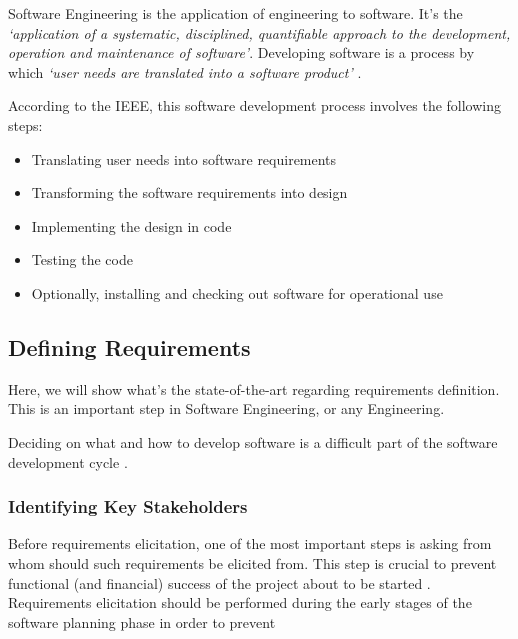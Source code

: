 Software Engineering is the application of engineering to software. It's the \textit{`application of a systematic, disciplined, quantifiable approach to the development, operation and maintenance of software'}. Developing software is a process by which \textit{`user needs are translated into a software product'} \parencite{8016712}.

According to the IEEE, this software development process involves the following steps:

\begin{itemize}

    \item Translating user needs into software requirements
    \item Transforming the software requirements into design
    \item Implementing the design in code
    \item Testing the code
    \item Optionally, installing and checking out software for operational use   
\end{itemize}






\subsection{Defining Requirements}\label{state-of-the-art:ss:defining-requirements}

Here, we will show what's the state-of-the-art regarding requirements definition. This is an important step in Software Engineering, or any Engineering.

Deciding on what and how to develop software is a difficult part of the software development cycle \parencite{pacheco_garcía_reyes_2018}.

\subsubsection{Identifying Key Stakeholders}\label{state-of-the-art:sss:identifying-key-stakeholders}

Before requirements elicitation, one of the most important steps is asking from whom should such requirements be elicited from. This step is crucial to prevent functional (and financial) success of the project about to be started \parencite{lewellen_2020}. Requirements elicitation should be performed during the early stages of the software planning phase in order to prevent



